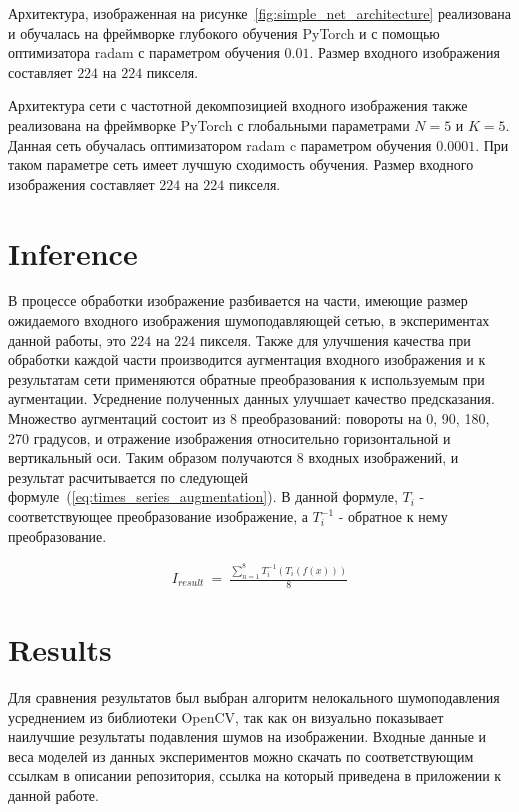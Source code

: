 \documentclass[runningheads]{llncs}
\begin{document}
Архитектура, изображенная на рисунке~\ref{fig:simple_net_architecture} реализована и обучалась на фреймворке глубокого обучения PyTorch и с помощью оптимизатора radam с параметром обучения $0.01$. Размер входного изображения составляет $224$ на $224$ пикселя.


Архитектура сети с частотной декомпозицией входного изображения также реализована на фреймворке PyTorch с глобальными параметрами $N = 5$ и $K = 5$. Данная сеть обучалась оптимизатором radam c параметром обучения $0.0001$. При таком параметре сеть имеет лучшую сходимость обучения. Размер входного изображения составляет $224$ на $224$ пикселя.

\section{Inference}
В процессе обработки изображение разбивается на части, имеющие размер ожидаемого входного изображения шумоподавляющей сетью, в экспериментах данной работы, это $224$ на $224$ пикселя. Также для улучшения качества при обработки каждой части производится аугментация входного изображения и к результатам сети применяются обратные преобразования к используемым при аугментации. Усреднение полученных данных улучшает качество предсказания. Множество аугментаций состоит из 8 преобразований: повороты на 0, 90, 180, 270 градусов, и отражение изображения относительно горизонтальной и вертикальный оси. Таким образом получаются 8 входных изображений, и результат расчитывается по следующей формуле~(\ref{eq:times_series_augmentation}). В данной формуле, $T_{i}$ - соответствующее преобразование изображение, а $T_{i}^{-1}$ - обратное к нему преобразование.

\begin{eqnarray}\label{eq:times_series_augmentation}
I_{result}\ =\ \frac{\sum_{n=1}^{8} T_{i}^{-1}(T_{i}(f(x)))}{8}
\end{eqnarray}


\section{Results}
Для сравнения результатов был выбран алгоритм нелокального шумоподавления усреднением из библиотеки OpenCV, так как он визуально показывает наилучшие результаты подавления шумов на изображении. Входные данные и веса моделей из данных экспериментов можно скачать по соответствующим ссылкам в описании репозитория, ссылка на который приведена в приложении к данной работе.
\end{document}
